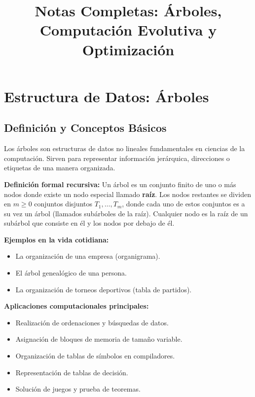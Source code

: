 \documentclass{article}
\title{Notas Completas: Árboles, Computación Evolutiva y Optimización}
\author{}
\date{}
\begin{document}
	\maketitle
	\tableofcontents
	\newpage
	
	\section{Estructura de Datos: Árboles}
	
	\subsection{Definición y Conceptos Básicos}
	Los árboles son estructuras de datos no lineales fundamentales en ciencias de la computación. Sirven para representar información jerárquica, direcciones o etiquetas de una manera organizada.
	
	\textbf{Definición formal recursiva:} Un árbol es un conjunto finito de uno o más nodos donde existe un nodo especial llamado \textbf{raíz}. Los nodos restantes se dividen en $m \ge 0$ conjuntos disjuntos $T_{1}, \dots, T_{m}$, donde cada uno de estos conjuntos es a su vez un árbol (llamados subárboles de la raíz). Cualquier nodo es la raíz de un subárbol que consiste en él y los nodos por debajo de él.
	
	\textbf{Ejemplos en la vida cotidiana:}
	\begin{itemize}
		\item La organización de una empresa (organigrama).
		\item El árbol genealógico de una persona.
		\item La organización de torneos deportivos (tabla de partidos).
	\end{itemize}
	
	\textbf{Aplicaciones computacionales principales:}
	\begin{itemize}
		\item Realización de ordenaciones y búsquedas de datos.
		\item Asignación de bloques de memoria de tamaño variable.
		\item Organización de tablas de símbolos en compiladores.
		\item Representación de tablas de decisión.
		\item Solución de juegos y prueba de teoremas.
	\end{itemize}
	
\end{document}
